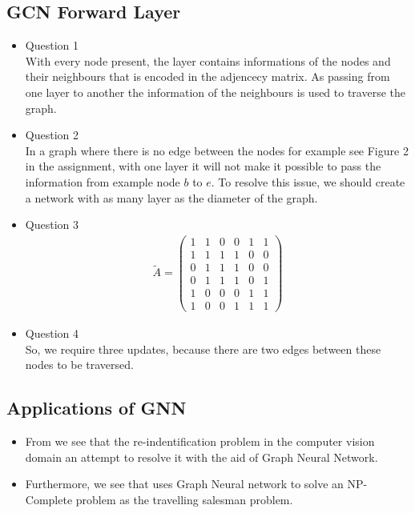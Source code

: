\documentclass{article}
\begin{document}
\subsection{GCN Forward Layer}
\begin{itemize}
  \item Question 1 \\
  With every node present, the layer contains informations of the nodes and their neighbours that is encoded in the adjencecy matrix. As passing from one layer to another the information of the neighbours is used to traverse the graph. 
  \item Question 2 \\
  In a graph where there is no edge between the nodes for example see Figure 2 in the assignment, with one layer it will not make it possible to pass the information from example node $b$ to $e$. To resolve this issue, we should create a network with as many layer as the diameter of the graph. 
  \item Question 3
  \begin{align*}
  \tilde{A}= \left(\begin{matrix}1&1&0&0&1&1\\1&1&1&1&0&0\\0&1&1&1&0&0\\0&1&1&1&0&1\\1&0&0&0&1&1\\1&0&0&1&1&1\end{matrix}\right)
  \end{align*}
  \item Question 4 \\
  So, we require three updates, because there are two edges between these nodes to be traversed. 
\end{itemize}

\subsection{Applications of GNN}
\begin{itemize}
  \item From \cite{shen2018person} we see that the re-indentification problem in the computer vision domain an attempt to resolve it with the aid of Graph Neural Network.
  \item Furthermore, we see that \cite{prates2019learning} uses Graph Neural network to solve an NP-Complete problem as the travelling salesman problem. 
\end{itemize}
\end{document}
